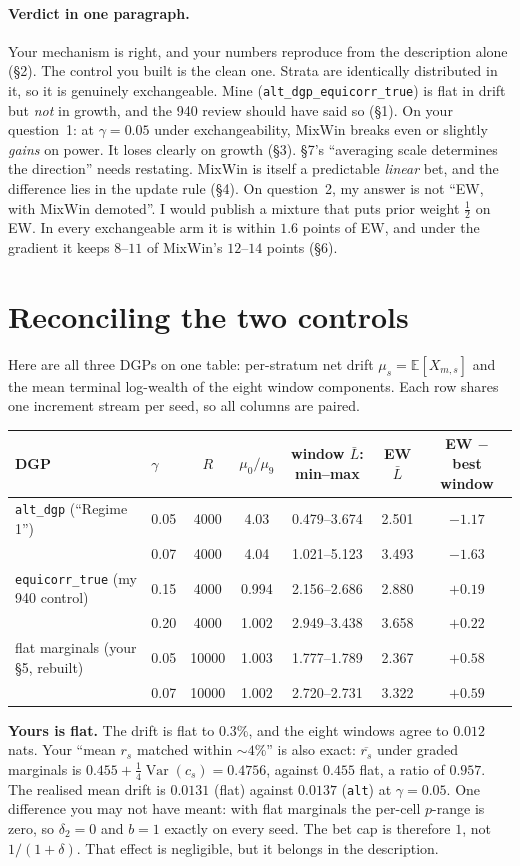 \documentclass[11pt]{article}
\newcommand{\E}{\mathbb{E}}
\begin{document}
\paragraph{Verdict in one paragraph.} Your mechanism is right, and your numbers reproduce from the description alone (\S2). The control you built is the clean one. Strata are identically distributed in it, so it is genuinely exchangeable. Mine (\texttt{alt\_dgp\_equicorr\_true}) is flat in drift but \emph{not} in growth, and the 940 review should have said so (\S1).
On your question~1: at $\gamma=0.05$ under exchangeability, MixWin breaks even or slightly \emph{gains} on power. It loses clearly on growth (\S3).
\S7's ``averaging scale determines the direction'' needs restating. MixWin is itself a predictable \emph{linear} bet, and the difference lies in the update rule (\S4).
On question~2, my answer is not ``EW, with MixWin demoted''. I would publish a mixture that puts prior weight $\tfrac12$ on EW. In every exchangeable arm it is within $1.6$ points of EW, and under the gradient it keeps $8$--$11$ of MixWin's $12$--$14$ points (\S6).

\section{Reconciling the two controls}\label{sec:controls}
Here are all three DGPs on one table: per-stratum net drift $\mu_s=\E[X_{m,s}]$ and the mean terminal log-wealth of the eight window components. Each row shares one increment stream per seed, so all columns are paired.
\begin{center}\small\setlength{\tabcolsep}{3.5pt}
\begin{tabular}{llccccc}
\toprule
DGP & $\gamma$ & $R$ & $\mu_0/\mu_9$ & window $\bar L$: min--max & EW $\bar L$ & EW $-$ best window\\
\midrule
\texttt{alt\_dgp} (``Regime 1'') & 0.05 & 4000 & 4.03 & 0.479--3.674 & 2.501 & $-1.17$\\
 & 0.07 & 4000 & 4.04 & 1.021--5.123 & 3.493 & $-1.63$\\
\texttt{equicorr\_true} (my 940 control) & 0.15 & 4000 & 0.994 & 2.156--2.686 & 2.880 & $+0.19$\\
 & 0.20 & 4000 & 1.002 & 2.949--3.438 & 3.658 & $+0.22$\\
flat marginals (your \S5, rebuilt) & 0.05 & 10000 & 1.003 & 1.777--1.789 & 2.367 & $+0.58$\\
 & 0.07 & 10000 & 1.002 & 2.720--2.731 & 3.322 & $+0.59$\\
\bottomrule
\end{tabular}
\end{center}
\textbf{Yours is flat.} The drift is flat to $0.3\%$, and the eight windows agree to $0.012$ nats. Your ``mean $r_s$ matched within ${\sim}4\%$'' is also exact: $\overline{r_s}$ under graded marginals is $0.455+\tfrac14\operatorname{Var}(c_s)=0.4756$, against $0.455$ flat, a ratio of $0.957$. The realised mean drift is $0.0131$ (flat) against $0.0137$ (\texttt{alt}) at $\gamma=0.05$. One difference you may not have meant: with flat marginals the per-cell $p$-range is zero, so $\delta_2=0$ and $b=1$ exactly on every seed. The bet cap is therefore $1$, not $1/(1+\delta)$. That effect is negligible, but it belongs in the description.
\end{document}
